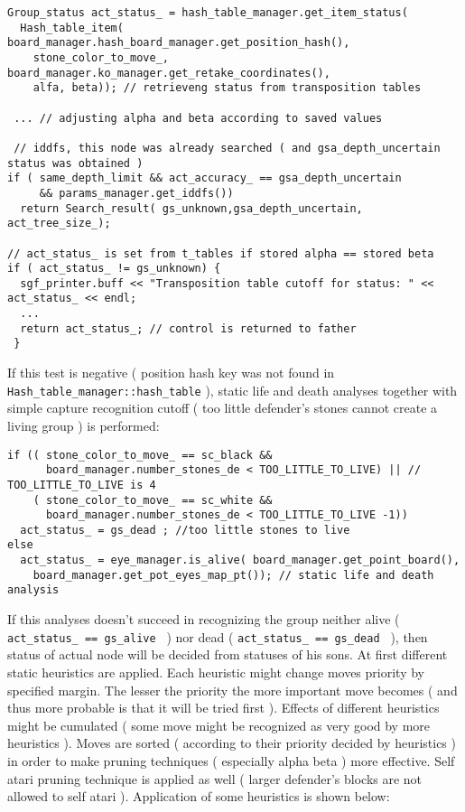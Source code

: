 \footnotesize\begin{verbatim}Group_status act_status_ = hash_table_manager.get_item_status( 
  Hash_table_item( board_manager.hash_board_manager.get_position_hash(),
    stone_color_to_move_, board_manager.ko_manager.get_retake_coordinates(),
    alfa, beta)); // retrieveng status from transposition tables 
        
 ... // adjusting alpha and beta according to saved values                                                                  
  
 // iddfs, this node was already searched ( and gsa_depth_uncertain status was obtained ) 
if ( same_depth_limit && act_accuracy_ == gsa_depth_uncertain 
     && params_manager.get_iddfs())
  return Search_result( gs_unknown,gsa_depth_uncertain, act_tree_size_); 

// act_status_ is set from t_tables if stored alpha == stored beta  
if ( act_status_ != gs_unknown) { 
  sgf_printer.buff << "Transposition table cutoff for status: " << act_status_ << endl;
  ...
  return act_status_; // control is returned to father
 }
\end{verbatim}
\normalsize


If this test is negative ( position hash key was not found in {\tt Hash\_\-table\_\-manager::hash\_\-table} ), static life and death analyses together with simple capture recognition cutoff ( too little defender's stones cannot create a living group ) is performed: 

\footnotesize\begin{verbatim}if (( stone_color_to_move_ == sc_black && 
      board_manager.number_stones_de < TOO_LITTLE_TO_LIVE) || // TOO_LITTLE_TO_LIVE is 4
    ( stone_color_to_move_ == sc_white && 
      board_manager.number_stones_de < TOO_LITTLE_TO_LIVE -1)) 
  act_status_ = gs_dead ; //too little stones to live  
else 
  act_status_ = eye_manager.is_alive( board_manager.get_point_board(),
    board_manager.get_pot_eyes_map_pt()); // static life and death analysis
\end{verbatim}
\normalsize


If this analyses doesn't succeed in recognizing the group neither alive ( {\tt  act\_\-status\_\- == gs\_\-alive } ) nor dead ( {\tt  act\_\-status\_\- == gs\_\-dead } ), then status of actual node will be decided from statuses of his sons. At first different static heuristics are applied. Each heuristic might change moves priority by specified margin. The lesser the priority the more important move becomes ( and thus more probable is that it will be tried first ). Effects of different heuristics might be cumulated ( some move might be recognized as very good by more heuristics ). Moves are sorted ( according to their priority decided by heuristics ) in order to make pruning techniques ( especially alpha beta ) more effective. Self atari pruning technique is applied as well ( larger defender's blocks are not allowed to self atari ). Application of some heuristics is shown below:



